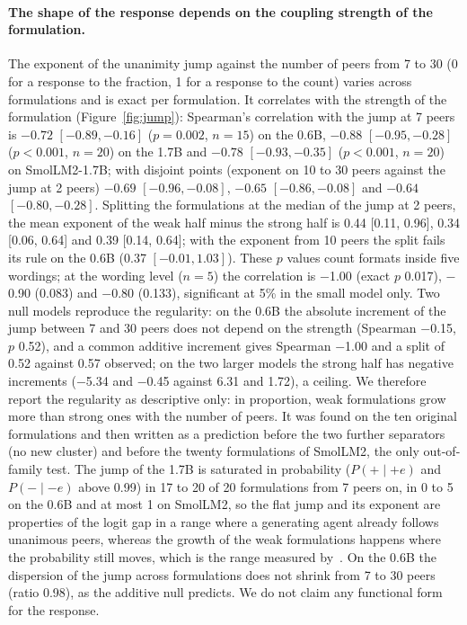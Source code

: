 \documentclass[11pt]{article}
\begin{document}
\paragraph{The shape of the response depends on the coupling strength of
the formulation.} The exponent of the unanimity jump against the number of
peers from 7 to 30 (0 for a response to the fraction, 1 for a response to
the count) varies across formulations and is exact per formulation. It
correlates with the strength of the formulation (Figure~\ref{fig:jump}):
Spearman's correlation with the jump at 7 peers is $-0.72$ $[-0.89, -0.16]$
($p = 0.002$, $n = 15$) on the 0.6B, $-0.88$ $[-0.95, -0.28]$ ($p < 0.001$,
$n = 20$) on the 1.7B and $-0.78$ $[-0.93, -0.35]$ ($p < 0.001$, $n = 20$)
on SmolLM2-1.7B; with disjoint points (exponent on 10 to 30 peers against
the jump at 2 peers) $-0.69$ $[-0.96, -0.08]$, $-0.65$ $[-0.86, -0.08]$
and $-0.64$ $[-0.80, -0.28]$. Splitting the formulations at the median of
the jump at 2 peers, the mean exponent of the weak half minus the strong
half is 0.44 [0.11, 0.96], 0.34 [0.06, 0.64] and 0.39 [0.14, 0.64]; with
the exponent from 10 peers the split fails its rule on the 0.6B
(0.37 $[-0.01, 1.03]$). These $p$ values count formats inside five
wordings; at the wording level ($n = 5$) the correlation is $-$1.00
(exact $p$ 0.017), $-$0.90 (0.083) and $-$0.80 (0.133),
significant at 5\% in the small model only. Two null models reproduce the
regularity: on the 0.6B the absolute increment of the jump between 7 and
30 peers does not depend on the strength (Spearman $-$0.15, $p$ 0.52),
and a common additive increment gives Spearman $-$1.00 and a split of
0.52 against 0.57 observed; on the two larger models the strong half
has negative increments ($-$5.34 and $-$0.45 against
6.31 and 1.72), a ceiling. We therefore report the regularity as descriptive only: in proportion, weak formulations grow more than strong ones with the number of peers.
It was found on the ten original formulations and then written as a
prediction before the two further separators (no new cluster) and before
the twenty formulations of SmolLM2, the only out-of-family test. The jump of the 1.7B is
saturated in probability ($P(+\mid +e)$ and $P(-\mid -e)$ above 0.99) in
17 to 20 of 20 formulations from 7 peers on, in 0 to 5 on the 0.6B and at
most 1 on SmolLM2, so the flat jump and its exponent are properties of the logit gap in a range where a generating agent already follows unanimous peers, whereas the growth of the weak formulations happens where the probability still moves, which is the range measured by~\cite{bellina2026}. On the 0.6B the dispersion of
the jump across formulations does not shrink from 7 to 30 peers (ratio
0.98), as the additive null predicts. We do not claim any functional form for the response.
\end{document}
